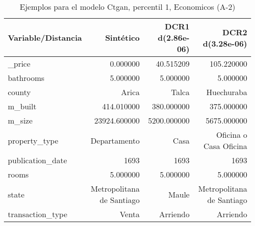 \begin{table}[H]
\centering
\fontsize{10}{14}\selectfont
\caption{Ejemplos para el modelo Ctgan, percentil 1, Economicos (A-2)}
\label{table-example-economicos-a-2-ctgan-1p}
\begin{tabular}{|l|r|r|r|}
\hline
\rowcolor[gray]{0.8}
Variable/Distancia & Sintético & DCR1 d(2.86e-06) & DCR2 d(3.28e-06) \\
\hline \_price & \cellcolor[rgb]{0.9, 0.54, 0.52} 0.000000 & 40.515209 & 105.220000 \\
\hline bathrooms & \cellcolor[rgb]{0.9, 0.54, 0.52} 5.000000 & \cellcolor[rgb]{0.9, 0.54, 0.52} 5.000000 & \cellcolor[rgb]{0.9, 0.54, 0.52} 5.000000 \\
\hline county & \cellcolor[rgb]{0.9, 0.54, 0.52} Arica & Talca & Huechuraba \\
\hline m\_built & \cellcolor[rgb]{0.9, 0.54, 0.52} 414.010000 & 380.000000 & 375.000000 \\
\hline m\_size & \cellcolor[rgb]{0.9, 0.54, 0.52} 23924.600000 & 5200.000000 & 5675.000000 \\
\hline property\_type & \cellcolor[rgb]{0.9, 0.54, 0.52} Departamento & Casa & Oficina o Casa Oficina \\
\hline publication\_date & \cellcolor[rgb]{0.9, 0.54, 0.52} 1693 & \cellcolor[rgb]{0.9, 0.54, 0.52} 1693 & \cellcolor[rgb]{0.9, 0.54, 0.52} 1693 \\
\hline rooms & \cellcolor[rgb]{0.9, 0.54, 0.52} 5.000000 & \cellcolor[rgb]{0.9, 0.54, 0.52} 5.000000 & \cellcolor[rgb]{0.9, 0.54, 0.52} 5.000000 \\
\hline state & \cellcolor[rgb]{0.9, 0.54, 0.52} Metropolitana de Santiago & Maule & \cellcolor[rgb]{0.9, 0.54, 0.52} Metropolitana de Santiago \\
\hline transaction\_type & \cellcolor[rgb]{0.9, 0.54, 0.52} Venta & Arriendo & Arriendo \\
\hline
\end{tabular}
\end{table}
